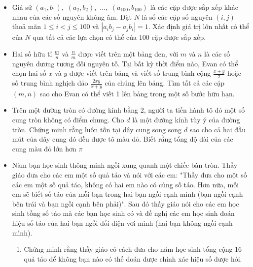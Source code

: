 \documentclass[11pt]{scrartcl}
\begin{document}
\begin{itemize}[label=, leftmargin=0em, itemsep=0.5em]
    \item \begin{btvn}
        Giả sử $(a_1,b_1),$ $(a_2,b_2),$ $\dots,$ $(a_{100},b_{100})$ là các cặp được sắp xếp khác nhau của các số nguyên không âm. Đặt $N$ là số các cặp số nguyên $(i,j)$ thoả mãn $1\leq i<j\leq 100$ và $|a_ib_j-a_jb_i|=1$. Xác định giá trị lớn nhất có thể của $N$ qua tất cả các lựa chọn có thể của $100$ cặp được sắp xếp.
    \end{btvn}

    \item \begin{btvn}
        Hai số hữu tỉ \(\tfrac{m}{n}\) và \(\tfrac{n}{m}\) được viết trên một bảng đen, với \(m\) và \(n\) là các số nguyên dương tương đối nguyên tố. Tại bất kỳ thời điểm nào, Evan có thể chọn hai số \(x\) và \(y\) được viết trên bảng và viết số trung bình cộng \(\tfrac{x+y}{2}\) hoặc số trung bình nghịch đảo \(\tfrac{2xy}{x+y}\) của chúng lên bảng. Tìm tất cả các cặp \((m,n)\) sao cho Evan có thể viết 1 lên bảng trong một số bước hữu hạn.
    \end{btvn}
    \item \begin{btvn}
        Trên một đường tròn có đường kính bằng 2, người ta tiến hành tô đỏ một số cung tròn không có điểm chung. Cho $d$ là một đường kính tùy ý của đường tròn. Chứng minh rằng luôn tồn tại dây cung song song $d$ sao cho cả hai đầu mút của dây cung đó đều được tô màu đỏ. Biết rằng tổng độ dài của các cung màu đỏ lớn hơn $\pi$
    \end{btvn}
    \item \begin{btvn}
        Năm bạn học sinh thông minh ngồi xung quanh một chiếc bàn tròn. Thầy giáo đưa cho các em một số quả táo và nói với các em: "Thầy đưa cho một số các em một số quả táo, không có hai em nào có cùng số táo. Hơn nữa, mỗi em sẽ biết số táo của mỗi bạn trong hai bạn ngồi cạnh mình (bạn ngồi cạnh bên trái và bạn ngồi cạnh bên phải)". Sau đó thầy giáo nói cho các em học sinh tồng số táo mà các bạn học sinh có và đề nghị các em học sinh đoán hiệu số táo của hai bạn ngồi đối diện vơi mình (hai bạn không ngồi cạnh mình).
        \begin{enumerate}[label=(\alph*)]
            \item Chứng minh rằng thầy giáo có cách đưa cho năm học sinh tổng cộng 16 quả táo để không bạn nào có thế đoán được chính xác hiệu số được hỏi.

\end{enumerate}
\end{btvn}
\end{itemize}
\end{document}
